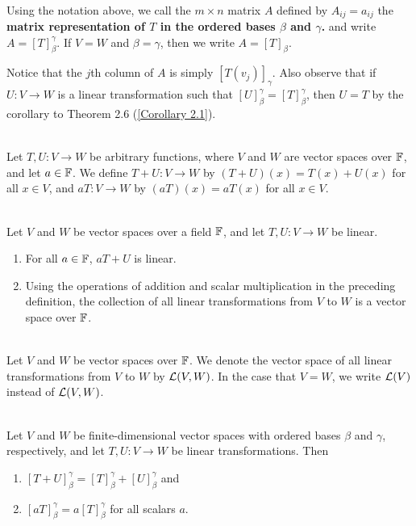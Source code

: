 \begin{definition}
	\hfill\\
	Using the notation above, we call the $m \times n$ matrix $A$ defined by $A_{ij} = a_{ij}$ the \textbf{matrix representation of $T$ in the ordered bases $\beta$ and $\gamma$.} and write $A = [T]_\beta^\gamma$. If $V = W$ and $\beta = \gamma$, then we write $A = [T]_\beta$.
	
	Notice that the $j$th column of $A$ is simply $[T(v_j)]_\gamma$. Also observe that if $U: V \to W$ is a linear transformation such that $[U]_\beta^\gamma = [T]_\beta^\gamma$, then $U=T$ by the corollary to Theorem 2.6 (\autoref{Corollary 2.1}).
\end{definition}

\begin{definition}
	\hfill\\
	Let $T,U: V \to W$ be arbitrary functions, where $V$ and $W$ are vector spaces over $\mathbb{F}$, and let $a \in \mathbb{F}$. We define $T + U: V \to W$ by $(T+U)(x) = T(x) + U(x)$ for all $x \in V$, and $aT: V \to W$ by $(aT)(x) = aT(x)$ for all $x \in V$.
\end{definition}

\begin{theorem}
	\hfill\\
	Let $V$ and $W$ be vector spaces over a field $\mathbb{F}$, and let $T,U: V \to W$ be linear.
	
	\begin{enumerate}
		\item For all $a \in \mathbb{F}$, $aT+U$ is linear.
		\item Using the operations of addition and scalar multiplication in the preceding definition, the collection of all linear transformations from $V$ to $W$ is a vector space over $\mathbb{F}$.
	\end{enumerate}
\end{theorem}

\begin{definition}
	\hfill\\
	Let $V$ and $W$ be vector spaces over $\mathbb{F}$. We denote the vector space of all linear transformations from $V$ to $W$ by $\mathcal{L}(V, W)$. In the case that $V = W$, we write $\mathcal{L}(V)$ instead of $\mathcal{L}(V, W)$.
\end{definition}

\begin{theorem}
	\hfill\\
	Let $V$ and $W$ be finite-dimensional vector spaces with ordered bases $\beta$ and $\gamma$, respectively, and let $T,U: V \to W$ be linear transformations. Then
	
	\begin{enumerate}
		\item $[T+U]_\beta^\gamma = [T]_\beta^\gamma + [U]_\beta^\gamma$ and
		\item $[aT]_\beta^\gamma = a[T]_\beta^\gamma$ for all scalars $a$.
	\end{enumerate}
\end{theorem}
